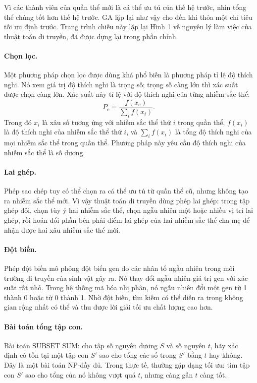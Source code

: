 \documentclass[11pt]{article}
\begin{document}
Vì các thành viên của quần thể mới là cá thể ưu tú của thế hệ trước, nhìn
tổng thể chúng tốt hơn thế hệ trước. GA lặp lại như vậy cho đến khi thỏa một
chỉ tiêu tối ưu định trước. Trang trình chiếu này lặp lại Hình 1 về nguyên
lý làm việc của thuật toán di truyền, đã được dựng lại trong phần chính.

\paragraph{Chọn lọc.}
Một phương pháp chọn lọc được dùng khá phổ biến là phương pháp tỉ lệ độ thích
nghi. Nó xem giá trị độ thích nghi là trọng số; trọng số càng lớn thì xác
suất được chọn càng lớn. Xác suất này tỉ lệ với độ thích nghi của từng nhiễm
sắc thể:
\[
  P_c=\frac{f(x_c)}{\sum_i f(x_i)}.
\]
Trong đó \(x_i\) là xâu số tương ứng với nhiễm sắc thể thứ \(i\) trong quần
thể, \(f(x_i)\) là độ thích nghi của nhiễm sắc thể thứ \(i\), và
\(\sum_i f(x_i)\) là tổng độ thích nghi của mọi nhiễm sắc thể trong quần thể.
Phương pháp này yêu cầu độ thích nghi của nhiễm sắc thể là số dương.

\paragraph{Lai ghép.}
Phép sao chép tuy có thể chọn ra cá thể ưu tú từ quần thể cũ, nhưng không
tạo ra nhiễm sắc thể mới. Vì vậy thuật toán di truyền dùng phép lai ghép:
trong tập ghép đôi, chọn tùy ý hai nhiễm sắc thể, chọn ngẫu nhiên một hoặc
nhiều vị trí lai ghép, rồi hoán đổi phần bên phải điểm lai ghép của hai
nhiễm sắc thể cha mẹ để nhận được hai xâu nhiễm sắc thể mới.

\paragraph{Đột biến.}
Phép đột biến mô phỏng đột biến gen do các nhân tố ngẫu nhiên trong môi
trường di truyền của sinh vật gây ra. Nó thay đổi ngẫu nhiên giá trị gen với
xác suất rất nhỏ. Trong hệ thống mã hóa nhị phân, nó ngẫu nhiên đổi một gen
từ 1 thành 0 hoặc từ 0 thành 1. Nhờ đột biến, tìm kiếm có thể diễn ra trong
không gian rộng nhất có thể và thu được lời giải tối ưu chất lượng cao hơn.

\paragraph{Bài toán tổng tập con.}
Bài toán \(\mathrm{SUBSET\_SUM}\): cho tập số nguyên dương \(S\) và số nguyên
\(t\), hãy xác định có tồn tại một tập con \(S'\) sao cho tổng các số trong
\(S'\) bằng \(t\) hay không. Đây là một bài toán NP-đầy đủ. Trong thực tế,
thường gặp dạng tối ưu: tìm tập con \(S'\) sao cho tổng của nó không vượt quá
\(t\), nhưng càng gần \(t\) càng tốt.
\end{document}
